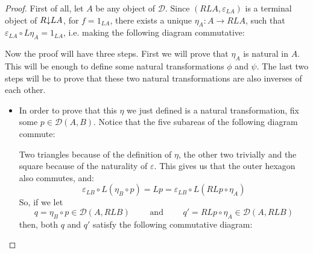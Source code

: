 \begin{proof} First of all, let $A$ be any object of $\mathcal{D}$. Since $(RLA,\varepsilon_{LA})$ is a terminal object of $\commaCat{R}{LA}$, for $f=1_{LA}$, there exists a unique $\eta_A:A\to RLA$, such that $\varepsilon_{LA}\circ L\eta_A=1_{LA}$, i.e. making the following diagram commutative:
\begin{center}
\end{center}
Now the proof will have three steps. First we will prove that $\eta_A$ is natural in $A$. This will be enough to define some natural transformations $\phi$ and $\psi$. The last two steps will be to prove that these two natural transformations are also inverses of each other.
\begin{itemize}
\item In order to prove that this $\eta$ we just defined is a natural transformation, fix some $p\in\mathcal{D}(A,B)$. Notice that the five subareas of the following diagram commute:
\begin{center}
\end{center}
Two triangles because of the definition of $\eta$, the other two trivially and the square because of the naturality of $\varepsilon$. This gives us that the outer hexagon also commutes, and:
\[\varepsilon_{LB}\circ L(\eta_B\circ p)=Lp=\varepsilon_{LB}\circ L(RLp\circ\eta_A)\]
So, if we let
\[q=\eta_B\circ p\in\mathcal{D}(A,RLB)\qquad\text{ and }\qquad q'=RLp\circ\eta_A\in\mathcal{D}(A,RLB)\]
then, both $q$ and $q'$ satisfy the following commutative diagram:
\begin{center}
\begin{tikzcd}

\end{tikzcd}
\end{center}
\end{itemize}
\end{proof}
